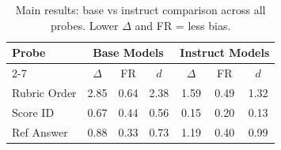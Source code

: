 \begin{table}[h]
\centering\small
\caption{Main results: base vs instruct comparison across all probes. Lower $\Delta$ and FR = less bias.}
\label{tab:main}
\begin{tabular}{|l|c|c|c|c|c|c|}
\hline
\multirow{2}{*}{Probe} & \multicolumn{3}{c|}{Base Models} & \multicolumn{3}{c|}{Instruct Models} \\
\cline{2-7}
 & $\Delta$ & FR & $d$ & $\Delta$ & FR & $d$ \\
\hline
Rubric Order & 2.85 & 0.64 & 2.38 & 1.59 & 0.49 & 1.32 \\
Score ID & 0.67 & 0.44 & 0.56 & 0.15 & 0.20 & 0.13 \\
Ref Answer & 0.88 & 0.33 & 0.73 & 1.19 & 0.40 & 0.99 \\
\hline
\end{tabular}
\end{table}